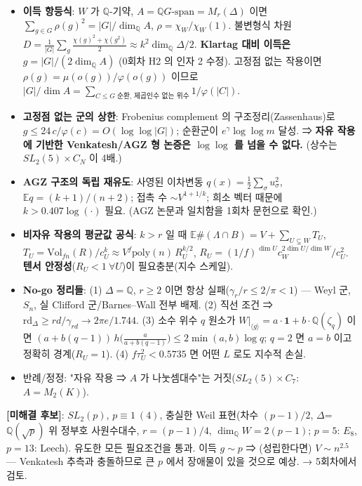 \begin{itemize}
\tightlist
\item
  \textbf{이득 항등식}: \(W\) 가 \(\mathbb Q\)-기약, \(A=\mathbb Q G\text{-span}=M_r(\Delta)\) 이면 \(\sum_{g\in G}\rho(g)^2=|G|/\dim_\mathbb QA\), \(\rho=\chi_W/\chi_W(1)\). 불변형식 차원 \(D=\frac1{|G|}\sum_g\frac{\chi(g)^2+\chi(g^2)}2\approx k^2\dim_\mathbb Q\Delta/2\). \textbf{Klartag 대비 이득은 \(g=|G|/(2\dim_\mathbb QA)\)} (0회차 H2 의 인자 2 수정). 고정점 없는 작용이면 \(\rho(g)=\mu(o(g))/\varphi(o(g))\) 이므로 \(|G|/\dim A=\sum_{C\le G\text{ 순환, 제곱인수 없는 위수}}1/\varphi(|C|)\).
\item
  \textbf{고정점 없는 군의 상한}: Frobenius complement 의 구조정리(Zassenhaus)로 \(g\le 24\,c/\varphi(c)=O(\log\log|G|)\); 순환군이 \(e^\gamma\log\log m\) 달성. ⇒ \textbf{자유 작용에 기반한 Venkatesh/AGZ 형 논증은 \(\log\log\) 를 넘을 수 없다.} (상수는 \(SL_2(5)\times C_N\) 이 4배.)
\item
  \textbf{AGZ 구조의 독립 재유도}: 사영된 이차변동 \(q(x)=\frac12\sum_\sigma u_\sigma^2\), \(\mathbb E q=(k+1)/(n+2)\); 접촉 수 \(\sim V^{1+1/k}\); 희소 벡터 때문에 \(k>0.407\log(\cdot)\) 필요. (AGZ 논문과 일치함을 1회차 문헌으로 확인.)
\item
  \textbf{비자유 작용의 평균값 공식}: \(k>r\) 일 때 \(\mathbb E\#(\Lambda\cap B)=V+\sum_{U\subsetneq W}T_U\), \(T_U=\mathrm{Vol}_{fn}(R)/c_U^k\approx V^f\mathrm{poly}(n)\,R_U^{k/2}\), \(R_U=(1/f)^{\dim U}c_W^{2\dim U/\dim W}/c_U^2\). \textbf{텐서 안정성}(\(R_U<1\ \forall U\))이 필요충분(지수 스케일).
\item
  \textbf{No-go 정리들}: (1) \(\Delta=\mathbb Q\), \(r\ge2\) 이면 항상 실패(\(\gamma_r/r\le2/\pi<1\)) --- Weyl 군, \(S_n\), 실 Clifford 군/Barnes--Wall 전부 배제. (2) 직선 조건 ⇒ \(\mathrm{rd}_\Delta\ge rd/\gamma_{rd}\to2\pi e/1.744\). (3) 소수 위수 \(q\) 원소가 \(W|_{\langle g\rangle}=a\cdot\mathbf1+b\cdot\mathbb Q(\zeta_q)\) 이면 \((a+b(q-1))\,h\!\big(\tfrac a{a+b(q-1)}\big)\le2\min(a,b)\log q\); \(q=2\) 면 \(a=b\) 이고 정확히 경계(\(R_U=1\)). (4) \(f\tau_U^2<0.5735\) 면 어떤 \(L\) 로도 지수적 손실.
\item
  반례/정정: "자유 작용 ⇒ \(A\) 가 나눗셈대수"는 거짓(\(SL_2(5)\times C_7\): \(A=M_2(K)\)).
\end{itemize}

\textbf{{[}미해결 후보{]}}: \(SL_2(p)\), \(p\equiv1\ (4)\), 충실한 Weil 표현(차수 \((p-1)/2\), \(\Delta\)=\(\mathbb Q(\sqrt p)\) 위 정부호 사원수대수, \(r=(p-1)/4\), \(\dim_\mathbb QW=2(p-1)\); \(p=5\): \(E_8\), \(p=13\): Leech). 유도한 모든 필요조건을 통과. 이득 \(g\sim p\) ⇒ (성립한다면) \(V\sim n^{2.5}\) --- Venkatesh 추측과 충돌하므로 큰 \(p\) 에서 장애물이 있을 것으로 예상. → 5회차에서 검토.

